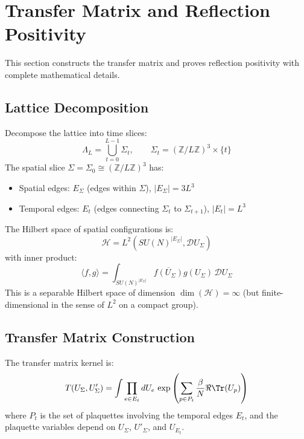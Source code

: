 \section{Transfer Matrix and Reflection Positivity}
\label{sec:transfer}
\label{sec:transfer-matrix}

This section constructs the transfer matrix and proves reflection positivity 
with complete mathematical details.

\subsection{Lattice Decomposition}

\begin{definition}
\label{def:time-slice}
Decompose the lattice into time slices:
\[
\Lambda_L = \bigcup_{t=0}^{L-1} \Sigma_t, \qquad \Sigma_t = (\mathbb{Z}/L\mathbb{Z})^3 \times \{t\}
\]
The spatial slice $\Sigma = \Sigma_0 \cong (\mathbb{Z}/L\mathbb{Z})^3$ has:
\begin{itemize}
    \item Spatial edges: $E_\Sigma$ (edges within $\Sigma$), $|E_\Sigma| = 3L^3$
    \item Temporal edges: $E_t$ (edges connecting $\Sigma_t$ to $\Sigma_{t+1}$), $|E_t| = L^3$
\end{itemize}
\end{definition}

\begin{definition}
\label{def:hilbert-space}
The Hilbert space of spatial configurations is:
\[
\mathcal{H} = L^2(SU(N)^{|E_\Sigma|}, \mathcal{D}U_\Sigma)
\]
with inner product:
\[
\langle f, g \rangle = \int_{SU(N)^{|E_\Sigma|}} \overline{f(U_\Sigma)} g(U_\Sigma) \, \mathcal{D}U_\Sigma
\]
This is a separable Hilbert space of dimension $\dim(\mathcal{H}) = \infty$ 
(but finite-dimensional in the sense of $L^2$ on a compact group).
\end{definition}

\subsection{Transfer Matrix Construction}

\begin{definition}
\label{def:transfer-kernel}
\label{lem:explicit-kernel}
The transfer matrix kernel is:
\[
T(U_\Sigma, U'_\Sigma) = \int \prod_{e \in E_t} dU_e \, \exp\left(\sum_{p \in P_t} \frac{\beta}{N} \Re\Tr(U_p)\right)
\]
where $P_t$ is the set of plaquettes involving the temporal edges $E_t$, and the 
plaquette variables depend on $U_\Sigma$, $U'_\Sigma$, and $U_{E_t}$.
\end{definition}

